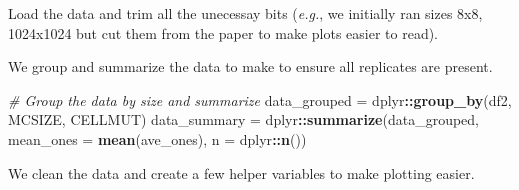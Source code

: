 \documentclass[]{book}
\newenvironment{Shaded}{\begin{snugshade}}{\end{snugshade}}
\newcommand{\CommentTok}[1]{\textcolor[rgb]{0.56,0.35,0.01}{\textit{#1}}}
\newcommand{\DataTypeTok}[1]{\textcolor[rgb]{0.13,0.29,0.53}{#1}}
\newcommand{\DecValTok}[1]{\textcolor[rgb]{0.00,0.00,0.81}{#1}}
\newcommand{\KeywordTok}[1]{\textcolor[rgb]{0.13,0.29,0.53}{\textbf{#1}}}
\newcommand{\NormalTok}[1]{#1}
\newcommand{\OperatorTok}[1]{\textcolor[rgb]{0.81,0.36,0.00}{\textbf{#1}}}
\newcommand{\StringTok}[1]{\textcolor[rgb]{0.31,0.60,0.02}{#1}}
\begin{document}
Load the data and trim all the unecessay bits (\emph{e.g.}, we initially ran sizes 8x8, 1024x1024 but cut them from the paper to make plots easier to read).

\begin{Shaded}
\end{Shaded}

We group and summarize the data to make to ensure all replicates are present.

\begin{Shaded}
\begin{Highlighting}[]
\CommentTok{# Group the data by size and summarize}
\NormalTok{data_grouped =}\StringTok{ }\NormalTok{dplyr}\OperatorTok{::}\KeywordTok{group_by}\NormalTok{(df2, MCSIZE, CELLMUT)}
\NormalTok{data_summary =}\StringTok{ }\NormalTok{dplyr}\OperatorTok{::}\KeywordTok{summarize}\NormalTok{(data_grouped, }\DataTypeTok{mean_ones =} \KeywordTok{mean}\NormalTok{(ave_ones), }\DataTypeTok{n =}\NormalTok{ dplyr}\OperatorTok{::}\KeywordTok{n}\NormalTok{())}
\end{Highlighting}
\end{Shaded}

We clean the data and create a few helper variables to make plotting easier.
\end{document}
